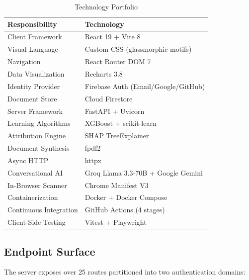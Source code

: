 \documentclass[conference]{IEEEtran}
\begin{document}
\begin{table}[htbp]
\caption{Technology Portfolio}
\label{tab:techstack}
\centering
\begin{tabular}{ll}
\toprule
\textbf{Responsibility} & \textbf{Technology} \\
\midrule
Client Framework & React 19 + Vite 8 \\
Visual Language & Custom CSS (glassmorphic motifs) \\
Navigation & React Router DOM 7 \\
Data Visualization & Recharts 3.8 \\
Identity Provider & Firebase Auth (Email/Google/GitHub) \\
Document Store & Cloud Firestore \\
Server Framework & FastAPI + Uvicorn \\
Learning Algorithms & XGBoost + scikit-learn \\
Attribution Engine & SHAP TreeExplainer \\
Document Synthesis & fpdf2 \\
Async HTTP & httpx \\
Conversational AI & Groq Llama 3.3-70B + Google Gemini \\
In-Browser Scanner & Chrome Manifest V3 \\
Containerization & Docker + Docker Compose \\
Continuous Integration & GitHub Actions (4 stages) \\
Client-Side Testing & Vitest + Playwright \\
\bottomrule
\end{tabular}
\end{table}

\subsection{Endpoint Surface}

The server exposes over 25 routes partitioned into two authentication domains:
\end{document}
